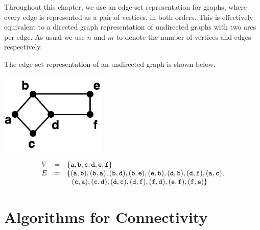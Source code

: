 \begin{flex}
\begin{assumption}
\label{graphcon::connect::graph-represent}
Throughout this chapter, we use an edge-set representation for graphs,
where every edge is represented as a pair of vertices, in both orders.
%
This is effectively equivalent to a directed graph representation of
undirected graphs with two arcs per edge.
%
As usual we use $n$ and $m$ to denote the number of vertices and edges respectively.
\end{assumption}

\begin{example}
\label{ex:graphcon::connect::graph-represent}

The edge-set representation of an undirected graph is shown below.

\begin{center}
  \includegraphics[width=2.0in]{./graph-contraction/media-connectivity/contract-example1.jpg}
\end{center}

\[
\begin{array}{lcl}
V & = & \left\{ \texttt{a},\texttt{b},\texttt{c},\texttt{d},\texttt{e},\texttt{f} \right\}\\
E & = &
\{(\texttt{a},\texttt{b}),(\texttt{b},\texttt{a}),(\texttt{b},\texttt{d}),(\texttt{b},\texttt{e}),(\texttt{e},\texttt{b}),(\texttt{d},\texttt{b}),(\texttt{d},\texttt{f}),(\texttt{a},\texttt{c}),
\\
& & ~~(\texttt{c},\texttt{a}),(\texttt{c},\texttt{d}),(\texttt{d},\texttt{c}),(\texttt{d},\texttt{f}),(\texttt{f},\texttt{d}),(\texttt{e},\texttt{f}),(\texttt{f},\texttt{e})\}
\end{array}
\]
\end{example}
\end{flex}

\section{Algorithms for Connectivity}
\label{sec:graphcon::connect::alg}

